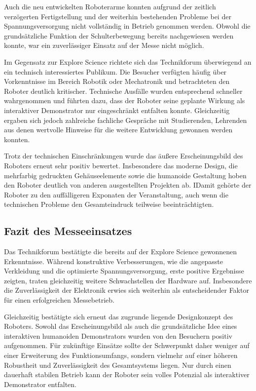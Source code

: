 Auch die neu entwickelten Roboterarme konnten aufgrund der zeitlich verzögerten Fertigstellung und der weiterhin bestehenden Probleme bei der Spannungsversorgung nicht vollständig in Betrieb genommen werden. Obwohl die grundsätzliche Funktion der Schulterbewegung bereits nachgewiesen werden konnte, war ein zuverlässiger Einsatz auf der Messe nicht möglich.

Im Gegensatz zur Explore Science richtete sich das Technikforum überwiegend an ein technisch interessiertes Publikum. Die Besucher verfügten häufig über Vorkenntnisse im Bereich Robotik oder Mechatronik und betrachteten den Roboter deutlich kritischer. Technische Ausfälle wurden entsprechend schneller wahrgenommen und führten dazu, dass der Roboter seine geplante Wirkung als interaktiver Demonstrator nur eingeschränkt entfalten konnte. Gleichzeitig ergaben sich jedoch zahlreiche fachliche Gespräche mit Studierenden, Lehrenden aus denen wertvolle Hinweise für die weitere Entwicklung gewonnen werden konnten.

Trotz der technischen Einschränkungen wurde das äußere Erscheinungsbild des Roboters erneut sehr positiv bewertet. Insbesondere das moderne Design, die mehrfarbig gedruckten Gehäuseelemente sowie die humanoide Gestaltung hoben den Roboter deutlich von anderen ausgestellten Projekten ab. IDamit gehörte der Roboter zu den auffälligeren Exponaten der Veranstaltung, auch wenn die technischen Probleme den Gesamteindruck teilweise beeinträchtigten. 

\subsection*{Fazit des Messeeinsatzes}

Das Technikforum bestätigte die bereits auf der Explore Science gewonnenen Erkenntnisse. Während konstruktive Verbesserungen, wie die angepasste Verkleidung und die optimierte Spannungsversorgung, erste positive Ergebnisse zeigten, traten gleichzeitig weitere Schwachstellen der Hardware auf. Insbesondere die Zuverlässigkeit der Elektronik erwies sich weiterhin als entscheidender Faktor für einen erfolgreichen Messebetrieb.

Gleichzeitig bestätigte sich erneut das zugrunde liegende Designkonzept des Roboters. Sowohl das Erscheinungsbild als auch die grundsätzliche Idee eines interaktiven humanoiden Demonstrators wurden von den Besuchern positiv aufgenommen. Für zukünftige Einsätze sollte der Schwerpunkt daher weniger auf einer Erweiterung des Funktionsumfangs, sondern vielmehr auf einer höheren Robustheit und Zuverlässigkeit des Gesamtsystems liegen. Nur durch einen dauerhaft stabilen Betrieb kann der Roboter sein volles Potenzial als interaktiver Demonstrator entfalten.